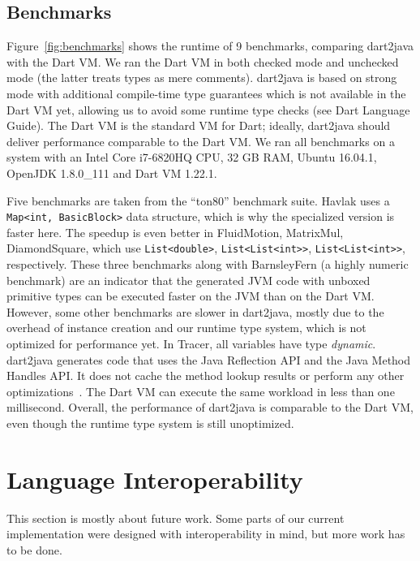 \documentclass[sigplan,9pt]{acmart}
\begin{document}

\subsection{Benchmarks}
Figure~\ref{fig:benchmarks} shows the runtime of 9 benchmarks, comparing dart2java with the Dart VM. We ran the Dart VM in both checked mode and unchecked mode (the latter treats types as mere comments). dart2java is based on strong mode with additional compile-time type guarantees which is not available in the Dart VM yet, allowing us to avoid some runtime type checks (see Dart Language Guide). The Dart VM is the standard VM for Dart; ideally, dart2java should deliver performance comparable to the Dart VM. We ran all benchmarks on a system with an Intel Core i7-6820HQ CPU, 32 GB RAM, Ubuntu 16.04.1, OpenJDK 1.8.0\_111 and Dart VM 1.22.1.

Five benchmarks are taken from the ``ton80'' benchmark suite. Havlak uses a \texttt{Map<int, BasicBlock>} data structure, which is why the specialized version is faster here. The speedup is even better in FluidMotion, MatrixMul, DiamondSquare, which use \texttt{List<double>}, \texttt{List<List<int>>},  \texttt{List<List<int>>}, respectively. These three benchmarks along with BarnsleyFern (a highly numeric benchmark) are an indicator that the generated JVM code with unboxed primitive types can be executed faster on the JVM than on the Dart VM. However, some other benchmarks are slower in dart2java, mostly due to the overhead of instance creation and our runtime type system, which is not optimized for performance yet. In Tracer, all variables have type \emph{dynamic}. dart2java generates code that uses the Java Reflection API and the Java Method Handles API. It does not cache the method lookup results or perform any other optimizations~\cite{Marr:2015:ZMR:2737924.2737963}. The Dart VM can execute the same workload in less than one millisecond. Overall, the performance of dart2java is comparable to the Dart VM, even though the runtime type system is still unoptimized.

\section{Language Interoperability}
\label{sec:interop}
This section is mostly about future work. Some parts of our current implementation were designed with interoperability in mind, but more work has to be done.
\end{document}
